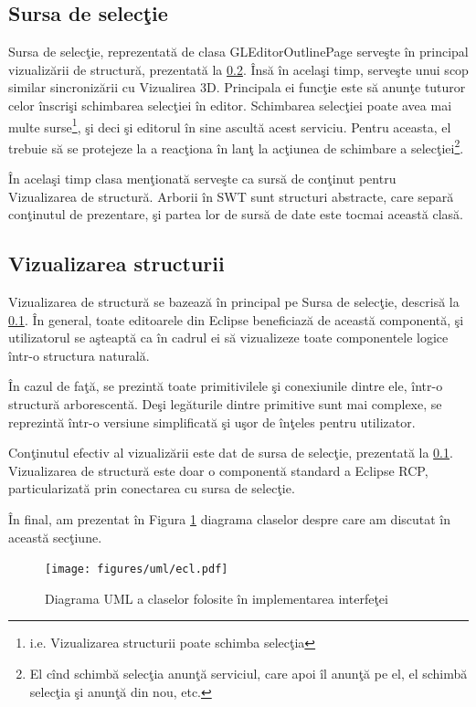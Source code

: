 \subsection{Sursa de selecţie}
\label{section:impl-selecta}
Sursa de selecţie, reprezentată de clasa GLEditorOutlinePage serveşte în 
principal vizualizării de structură, prezentată la \ref{section:impl-outline}. 
Însă în acelaşi timp, serveşte unui scop similar sincronizării cu Vizualirea 
3D. Principala ei funcţie este să anunţe tuturor celor înscrişi schimbarea 
selecţiei în editor. Schimbarea selecţiei poate avea mai multe 
surse\footnote{i.e. Vizualizarea structurii poate schimba selecţia}, şi deci şi 
editorul în sine ascultă acest serviciu. Pentru aceasta, el trebuie să se
protejeze la a reacţiona în lanţ la acţiunea de schimbare a
selecţiei\footnote{El cînd schimbă selecţia anunţă serviciul, care apoi îl
anunţă pe el, el schimbă selecţia şi anunţă din nou, etc.}.

În acelaşi timp clasa menţionată serveşte ca sursă de conţinut pentru
Vizualizarea de structură. Arborii în SWT sunt structuri abstracte, care separă
conţinutul de prezentare, şi partea lor de sursă de date este tocmai această
clasă.

\subsection{Vizualizarea structurii}
\label{section:impl-outline}

Vizualizarea de structură se bazează în principal pe Sursa de selecţie, descrisă
la \ref{section:impl-selecta}. În general, toate editoarele din Eclipse
beneficiază de această componentă, şi utilizatorul se aşteaptă ca în cadrul ei
să vizualizeze toate componentele logice într-o structura naturală.

În cazul de faţă, se prezintă toate primitivilele şi conexiunile dintre ele,
într-o structură arborescentă. Deşi legăturile dintre primitive sunt mai
complexe, se reprezintă într-o versiune simplificată şi uşor de înţeles pentru
utilizator.

Conţinutul efectiv al vizualizării este dat de sursa de selecţie, prezentată la
\ref{section:impl-selecta}. Vizualizarea de structură este doar o componentă
standard a Eclipse RCP, particularizată prin conectarea cu sursa de selecţie.

În final, am prezentat în Figura \ref{figure:uml-ecl} diagrama claselor despre
care am discutat în această secţiune.

\begin{figure}[htp]
\begin{center}
  \texttt{[image: figures/uml/ecl.pdf]}
  \caption{Diagrama UML a claselor folosite în implementarea interfeţei}
  \label{figure:uml-ecl}
\end{center}
\end{figure}